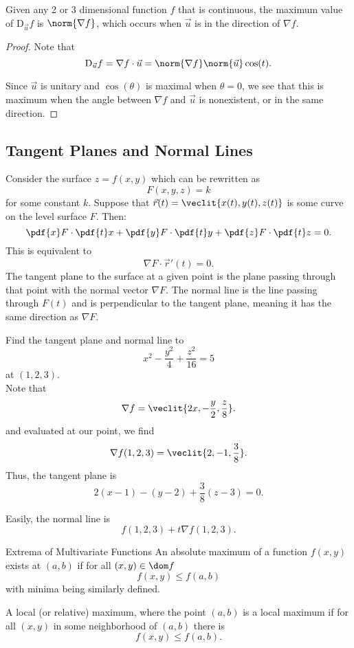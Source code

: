 \documentclass{article}
\begin{document}
\begin{thm}
  Given any 2 or 3 dimensional function $f$ that is continuous, the maximum value of
  $\mathrm{D}_{\vec{u}}f$ is $\norm{\nabla f}$, which occurs when $\vec{u}$ is in the direction of $\nabla f$.

  \begin{proof}
    Note that
    \[
      \mathrm{D}_{\vec{u}}f = \nabla f \cdot \vec{u} = \norm{\nabla f}\norm{\vec{u}}\cos(t).
    \]

    Since $\vec{u}$ is unitary and $\cos(\theta)$ is maximal when $\theta = 0$, we see that
    this is maximum when the angle between $\nabla f$ and $\vec{u}$ is nonexistent, or in the
    same direction.
  \end{proof}
\end{thm}

\subsection{Tangent Planes and Normal Lines}
Consider the surface $z = f(x, y)$ which can be rewritten as
\[
  F(x, y, z) = k
\]
for some constant $k$. Suppose that $\vec{r}(t) = \veclit{x(t), y(t), z(t)}$ is some curve
on the level surface $F$. Then:
\[
  \pdf{x}F \cdot \pdf{t}x + \pdf{y}F \cdot \pdf{t}y  + \pdf{z}F \cdot \pdf{t}z = 0.
\]
This is equivalent to
\[
  \nabla F \cdot \vec{r}'(t) = 0.
\]
The tangent plane to the surface at a given point is the plane passing through that point
with the normal vector $\nabla F$.
The normal line is the line passing through $F(t)$ and is perpendicular to the tangent plane, meaning it
has the same direction as $\nabla F$.

\begin{ex}
  Find the tangent plane and normal line to
  \[
    x^{2} - \frac{y^{2}}{4} + \frac{z^{2}}{16} = 5
  \]
  at $(1, 2, 3)$.\\
  Note that
  \[
    \nabla f = \veclit{2x, -\frac{y}{2}, \frac{z}{8}}.
  \]
  and evaluated at our point, we find
  \[
    \nabla f(1, 2, 3) = \veclit{2, -1, \frac{3}{8}}.
  \]
  Thus, the tangent plane is
  \[
  2(x - 1) - (y - 2) + \frac{3}{8}(z - 3) = 0.
  \]

  Easily, the normal line is
  \[
    f(1, 2, 3) + t \nabla f(1, 2, 3).
  \]

\end{ex}

\begin{defn}{Extrema of Multivariate Functions}{}
  An absolute maximum of a function $f(x, y)$ exists at $(a, b)$
  if for all $(x, y) \in \dom f$
  \[
    f(x, y) \le f(a, b)
  \]
  with minima being similarly defined.

  A local (or relative) maximum, where the point $(a, b)$
  is a local maximum if for all $(x, y)$ in some neighborhood of $(a, b)$ there is
  \[
    f(x, y) \le f(a, b).
  \]
\end{defn}
\end{document}
